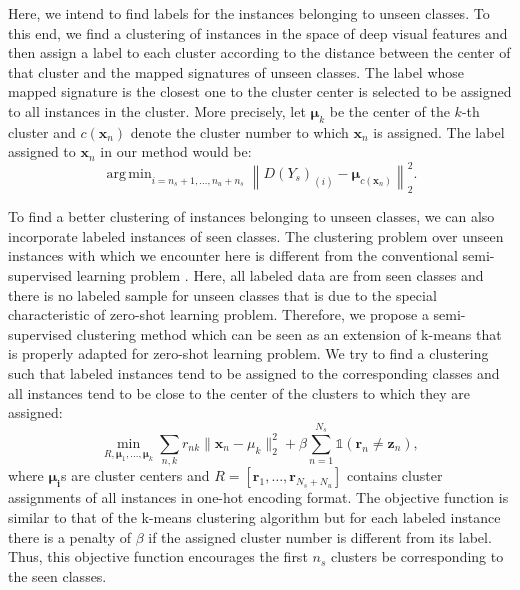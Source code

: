 \documentclass[10pt,twocolumn,letterpaper]{article}
\newcommand{\normtwo}[1]{\left \lVert #1 \right \rVert_2^2}
\DeclareMathOperator*{\argmin}{arg\,min}
\DeclareMathOperator*{\minimize}{min}
\begin{document}
Here, we intend to find labels for the instances belonging to unseen classes. To this end, we find a clustering of instances
 in the space of deep visual features and then assign a label to each cluster according to the distance between the center of that cluster
 and the mapped signatures of unseen classes.
The label whose mapped signature is the closest one to the cluster center is selected to be assigned to all instances in the cluster.
More precisely, let $\boldsymbol{\mu}_k$ be the center of the $k$-th cluster and $c(\mathbf{x}_n)$ denote the cluster number to which $\mathbf{x}_n$ is assigned.
The label assigned to $\mathbf{x}_n$ in our method would be:
\begin{equation}
  \argmin_{i=n_s + 1,\ldots, n_u + n_s} \normtwo{ D(Y_s)_{(i)} - \boldsymbol{\mu}_{c(\mathbf{x}_n)} }.
\end{equation}

To find a better clustering of instances belonging to unseen classes,
 we can also incorporate labeled instances of seen classes.
  The clustering problem over unseen instances with which we encounter here is different from the conventional semi-supervised learning problem \cite{chapel06}.
Here, all labeled data are from seen classes and there is no labeled sample for unseen classes that is due to the special characteristic of zero-shot
 learning problem. Therefore, we propose a semi-supervised clustering method which can be seen as an extension of k-means that is properly
 adapted for zero-shot learning problem.
 We try to find a clustering such that labeled instances tend to be assigned to the corresponding classes
  and all instances tend to be close to the center of the clusters to which they are assigned:
\begin{equation} \label{eq:simple}
\minimize_{R, \boldsymbol{\mu}_1, \ldots, \boldsymbol{\mu}_k }  \sum_{n,k} r_{nk} \lVert \mathbf{x}_n - {\mu}_k \rVert_2^2 +
 \beta \sum_{n=1}^{N_s} \mathds{1}(\mathbf{r}_n \neq \mathbf{z}_n),
\end{equation}
where $\boldsymbol{\mu_i}$s are cluster centers and $R = [\mathbf{r}_1, \ldots, \mathbf{r}_{N_s + N_u } ]$ contains cluster assignments
 of all instances in one-hot encoding format.
The objective function is similar to that of the k-means clustering algorithm but for each labeled instance
 there is a penalty of $\beta$ if the assigned cluster number is different from its label. Thus, this objective function encourages
the first $n_s$ clusters be corresponding to the seen classes.
\end{document}
